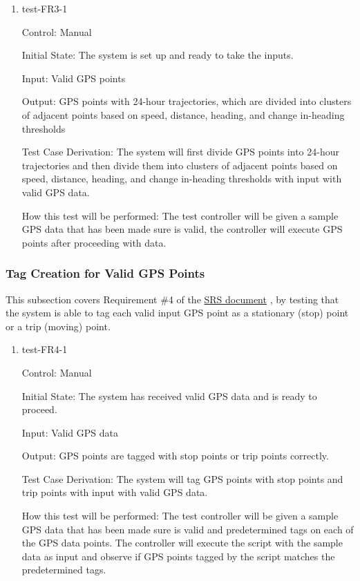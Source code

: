 \documentclass[12pt, titlepage]{article}
\begin{document}
\begin{enumerate}

\item{test-FR3-1\\} \label{test-FR3-1}

Control: Manual 
					
Initial State: The system is set up and ready to take the inputs.
					
Input: Valid GPS points 
					
Output: GPS points with 24-hour trajectories, which are divided into clusters of
adjacent points based on speed, distance, heading, and change in-heading thresholds

Test Case Derivation: The system will first divide GPS points into 24-hour trajectories and then divide them into clusters of adjacent points based on speed, distance, heading, and change in-heading thresholds with input with valid GPS data.
					
How this test will be performed: The test controller will be given a sample GPS data that has been made sure is valid, the controller will execute GPS points after proceeding with data.

\end{enumerate}

\subsubsection{Tag Creation for Valid GPS Points}

This subsection covers Requirement \#4 of the \href{https://github.com/paezha/PyERT-BLACK/blob/main/docs/SRS/SRS.pdf}{SRS document} \citep{SRS}, by testing that the system is able to tag each valid input GPS point as a stationary (stop) point or a trip (moving) point.

\begin{enumerate}

\item{test-FR4-1\\} \label{test-FR4-1}

Control: Manual 
					
Initial State: The system has received valid GPS data and is ready to proceed. 
					
Input: Valid GPS data
					
Output: GPS points are tagged with stop points or trip points correctly.

Test Case Derivation: The system will tag GPS points with stop points and trip points with input with valid GPS data.
					
How this test will be performed: The test controller will be given a sample GPS data that has been made sure is valid and predetermined tags on each of the GPS data points. The controller will execute the script with the sample data as input and observe if GPS points tagged by the script matches the predetermined tags.

\end{enumerate}
\end{document}
